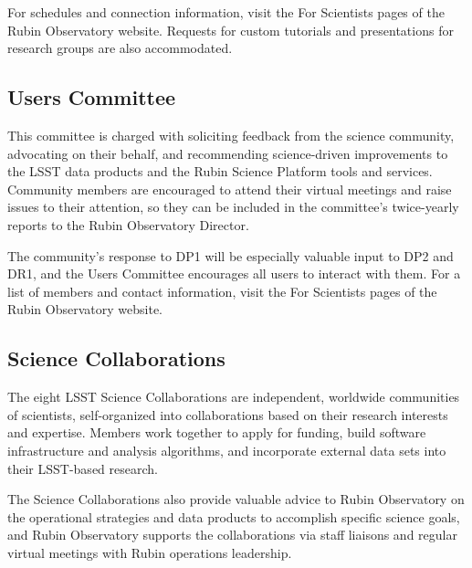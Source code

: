 For schedules and connection information, visit the For Scientists pages of the Rubin Observatory website.
Requests for custom tutorials and presentations for research groups are also accommodated.


\subsection{Users Committee
\label{ssec:users_committee}}

This committee is charged with soliciting feedback from the science community, advocating on their behalf, and recommending science-driven improvements to the LSST data products and the Rubin Science Platform tools and services.
Community members are encouraged to attend their virtual meetings and raise issues to their attention, so they can be included in the committee's twice-yearly reports to the Rubin Observatory Director.

The community's response to DP1 will be especially valuable input to DP2 and DR1, and the Users Committee encourages all users to interact with them.
For a list of members and contact information, visit the For Scientists pages of the Rubin Observatory website.


\subsection{Science Collaborations
\label{ssec:science_collaborations}}

The eight LSST Science Collaborations are independent, worldwide communities of scientists, self-organized into collaborations based on their research interests and expertise.
Members work together to apply for funding, build software infrastructure and analysis algorithms, and incorporate external data sets into their LSST-based research. 

The Science Collaborations also provide valuable advice to Rubin Observatory on the operational strategies and data products to accomplish specific science goals, and Rubin Observatory supports the collaborations via staff liaisons and regular virtual meetings with Rubin operations leadership.
